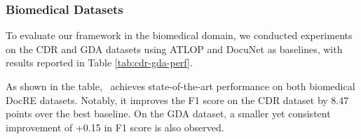 \subsubsection{Biomedical Datasets}
To evaluate our framework in the biomedical domain, we conducted experiments on the CDR and GDA datasets using ATLOP and DocuNet as baselines, with results reported in Table \ref{tab:cdr-gda-perf}.
\begin{table}[!ht]
\centering
{}
\caption{Model performance on CDR and GDA datasets.}
\label{tab:cdr-gda-perf}
\vspace{-5mm}
\end{table}

As shown in the table, \model\ achieves state-of-the-art performance on both biomedical DocRE datasets. Notably, it improves the F1 score on the CDR dataset by 8.47 points over the best baseline. On the GDA dataset, a smaller yet consistent improvement of +0.15 in F1 score is also observed.

